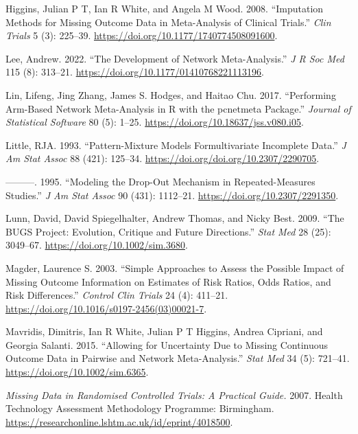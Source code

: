 \begin{CSLReferences}{1}{0}
\leavevmode{}%
Higgins, Julian P T, Ian R White, and Angela M Wood. 2008. {``Imputation Methods for Missing Outcome Data in Meta-Analysis of Clinical Trials.''} \emph{Clin Trials} 5 (3): 225--39. \url{https://doi.org/10.1177/1740774508091600}.

\leavevmode{}%
Lee, Andrew. 2022. {``The Development of Network Meta-Analysis.''} \emph{J R Soc Med} 115 (8): 313--21. \url{https://doi.org/10.1177/01410768221113196}.

\leavevmode{}%
Lin, Lifeng, Jing Zhang, James S. Hodges, and Haitao Chu. 2017. {``Performing Arm-Based Network Meta-Analysis in {R} with the {pcnetmeta} Package.''} \emph{Journal of Statistical Software} 80 (5): 1--25. \url{https://doi.org/10.18637/jss.v080.i05}.

\leavevmode{}%
Little, RJA. 1993. {``Pattern-Mixture Models Formultivariate Incomplete Data.''} \emph{J Am Stat Assoc} 88 (421): 125--34. \url{https://doi.org/doi.org/10.2307/2290705}.

\leavevmode{}%
---------. 1995. {``Modeling the Drop-Out Mechanism in Repeated-Measures Studies.''} \emph{J Am Stat Assoc} 90 (431): 1112--21. \url{https://doi.org/10.2307/2291350}.

\leavevmode{}%
Lunn, David, David Spiegelhalter, Andrew Thomas, and Nicky Best. 2009. {``The BUGS Project: Evolution, Critique and Future Directions.''} \emph{Stat Med} 28 (25): 3049--67. \url{https://doi.org/10.1002/sim.3680}.

\leavevmode{}%
Magder, Laurence S. 2003. {``Simple Approaches to Assess the Possible Impact of Missing Outcome Information on Estimates of Risk Ratios, Odds Ratios, and Risk Differences.''} \emph{Control Clin Trials} 24 (4): 411--21. \url{https://doi.org/10.1016/s0197-2456(03)00021-7}.

\leavevmode{}%
Mavridis, Dimitris, Ian R White, Julian P T Higgins, Andrea Cipriani, and Georgia Salanti. 2015. {``Allowing for Uncertainty Due to Missing Continuous Outcome Data in Pairwise and Network Meta-Analysis.''} \emph{Stat Med} 34 (5): 721--41. \url{https://doi.org/10.1002/sim.6365}.

\leavevmode{}%
\emph{Missing Data in Randomised Controlled Trials: A Practical Guide.} 2007. Health Technology Assessment Methodology Programme: Birmingham. \url{https://researchonline.lshtm.ac.uk/id/eprint/4018500}.


\end{CSLReferences}
